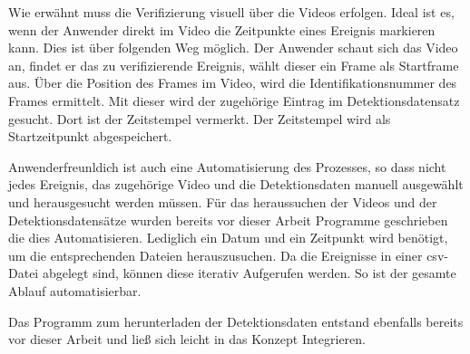 
Wie erwähnt muss die Verifizierung visuell über die Videos erfolgen. Ideal ist es, wenn der Anwender direkt im Video die Zeitpunkte eines Ereignis markieren kann. Dies ist über folgenden Weg möglich. Der Anwender schaut sich das Video an, findet er das zu verifizierende Ereignis, wählt dieser ein Frame als Startframe aus. Über die Position des Frames im Video, wird die Identifikationsnummer des Frames ermittelt. Mit dieser wird der zugehörige Eintrag im Detektionsdatensatz gesucht. Dort ist der Zeitstempel vermerkt. Der Zeitstempel wird als Startzeitpunkt abgespeichert. \par 

Anwenderfreunldich ist auch eine Automatisierung des Prozesses, so dass nicht jedes Ereignis, das zugehörige Video und die Detektionsdaten manuell ausgewählt und herausgesucht werden müssen. Für das heraussuchen der Videos und der Detektionsdatensätze wurden bereits vor dieser Arbeit Programme geschrieben die dies Automatisieren. Lediglich ein Datum und ein Zeitpunkt wird benötigt, um die entsprechenden Dateien herauszusuchen. Da die Ereignisse in einer csv-Datei abgelegt sind, können diese iterativ Aufgerufen werden. So ist der gesamte Ablauf automatisierbar. \par

Das Programm zum herunterladen der Detektionsdaten entstand ebenfalls bereits vor dieser Arbeit und ließ sich leicht in das Konzept Integrieren. 